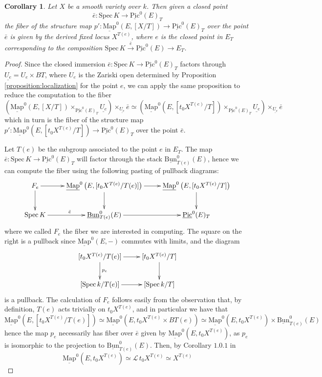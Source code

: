 \documentclass[11pt,letterpaper]{amsart}
\newtheorem{corollary}[dummy]{Corollary}
\newcommand{\cL}{\mathcal{L}}
\newcommand{\Mapo}[2]{\underline{\mathrm{Map}}^{0}\left (#1,#2\right )}
\newcommand{\Spec}{\mathrm{S}\mathrm{pec}\,}
\newcommand{\Pic}{\underline{\mathrm{Pic}}}
\newcommand{\Bun}{\underline{\mathrm{Bun}}}
\begin{document}
\begin{corollary}\label{corollary:fibers}
Let $X$ be a smooth variety over $k$. Then given a closed point $$\bar{e}:\Spec K\rightarrow\Pic^0(E)_T$$ the fiber of the structure map $p':\Mapo{E}{[X/T]}\rightarrow\Pic^0(E)_T$ over the point $\bar{e}$ is given by  the derived fixed locus $X^{T(e)}$, where $e$ is the closed point in $E_T$ corresponding to the composition $\Spec K\xrightarrow{\bar{e}}\Pic^0(E)\to E_T$.
\end{corollary}
\begin{proof}
Since the closed immersion $\bar{e}:\Spec K\rightarrow\Pic^0(E)_T$ factors through $\underline{U_e}=U_e\times BT$, where $U_e$ is the Zariski open determined by Proposition \ref{proposition:localization} for the point $e$, we can apply   the same proposition to reduce the computation to the fiber 
\begin{equation*}
\left (\Mapo{E}{[X/T]}\times_{\Pic^0(E)_T} \underline{U_e}\right )\times_{\underline{U_e}}\bar{e}\simeq\left (\Mapo{E}{[t_0 X^{T(e)}/T]}\times_{\Pic^0(E)_T} \underline{U_e}\right )\times_{\underline{U_e}}\bar{e}
\end{equation*}
which in turn is the fiber of the structure map $p':\Mapo{E}{[t_0 X^{T(e)}/T]}\rightarrow\Pic^0(E)_T$ over the point $\bar{e}$. 

Let $T(e)$ be the subgroup associated to the point $e$ in $E_T$. The map $\bar{e}:\Spec K\rightarrow\Pic^0(E)_T$ will factor through the stack $\Bun^0_{T(e)}(E)$, hence we can compute the fiber using the following pasting of pullback diagrams:
$$
\xymatrix{
F_{e} \ar[r]\ar[d]  &\Mapo{E}{[t_0 X^{T(e)} /T(e)]} \ar[r]\ar[d]  & \Mapo{E}{[t_0 X^{T(e)}/T]}\ar[d] \\
\Spec K \ar[r]^{\bar{e}}                 &\Bun^0_{T(e)}(E) \ar[r]               & \Pic^0(E)_T
}
$$
where we called $F_{e}$ the fiber we are interested in computing. The square on the right is a pullback since $\Mapo{E}{-}$ commutes with limits, and the diagram
$$
\xymatrix{
[t_0 X^{T(e)} /T(e)] \ar[r] \ar[d]^{p_e}  & [t_0 X^{T(e)}/T]\ar[d] \\
[\Spec k/T(e)] \ar[r]               & [\Spec k/T]
}
$$
is a pullback. The calculation of $F_{e}$ follows easily from the observation that, by definition, $T(e)$ acts trivially on $t_0 X^{T(e)}$, and in particular we have that 
\begin{equation*}
 \Mapo{E}{[t_0 X^{T(e)} /T(e)]} \simeq \Mapo{E}{t_0 X^{T(e)} \times BT(e)} \simeq \Mapo{E}{t_0 X^{T(e)}} \times \Bun^0_{T(e)}(E)
\end{equation*} 
hence the map $p_e$ necessarily has fiber over $\bar{e}$ given by $\Mapo{E}{t_0 X^{T(e)}}$, as $p_e$ is isomorphic to the projection to $\Bun^0_{T(e)}(E)$. Then, by Corollary $1.0.1$ in \cite{HChen}  
\begin{equation*}
\Mapo{E}{t_0 X^{T(e)}}\simeq\cL\, t_0 X^{T(e)} \simeq X^{T(e)}
\end{equation*} 
\end{proof}
\end{document}
